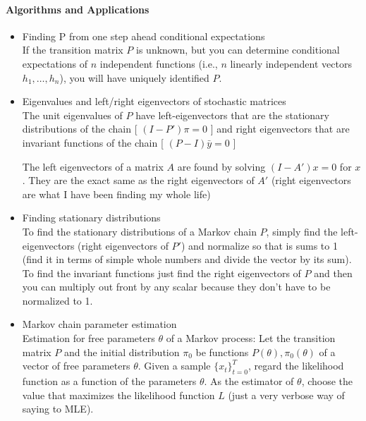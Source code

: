 \documentclass[11pt]{article}
\begin{document}
\paragraph{Algorithms and Applications}
\label{sec-1-1-1-2}
\begin{itemize}

\item Finding P from one step ahead conditional expectations\\
\label{sec-1-1-1-2-1}%
If the transition matrix $P$ is unknown, but you can determine
     conditional expectations of $n$ independent functions (i.e., $n$
     linearly independent vectors $h_1, \dots, h_n$), you will have
     uniquely identified $P$.


\item Eigenvalues and left/right eigenvectors of stochastic matrices\\
\label{sec-1-1-1-2-2}%
The unit eigenvalues of $P$ have left-eigenvectors that are the
     stationary distributions of the chain [ $(I - P')\pi = 0$ ] and
     right eigenvectors that are invariant functions of the chain [
     $(P-I) \bar{y} = 0$ ]

     The left eigenvectors of a matrix $A$ are found by solving $(I -
     A') x = 0$ for $x$. They are the exact same as the right
     eigenvectors of $A'$ (right eigenvectors are what I have been
     finding my whole life)


\item Finding stationary distributions\\
\label{sec-1-1-1-2-3}%
To find the stationary distributions of a Markov chain $P$,
     simply find the left-eigenvectors (right eigenvectors of $P'$)
     and normalize so that is sums to 1 (find it in terms of simple
     whole numbers and divide the vector by its sum). To find the
     invariant functions just find the right eigenvectors of $P$ and
     then you can multiply out front by any scalar because they don't
     have to be normalized to 1.


\item Markov chain parameter estimation\\
\label{sec-1-1-1-2-4}%
Estimation for free parameters $\theta$ of a Markov process: Let
     the transition matrix $P$ and the initial distribution $\pi_0$ be
     functions $P(\theta), \pi_0(\theta)$ of a vector of free
     parameters $\theta$. Given a sample $\{x_t\}_{t=0}^T$, regard the
     likelihood function as a function of the parameters $\theta$. As
     the estimator of $\theta$, choose the value that maximizes the
     likelihood function $L$ (just a very verbose way of saying to
     MLE).

\end{itemize} %
\end{document}
